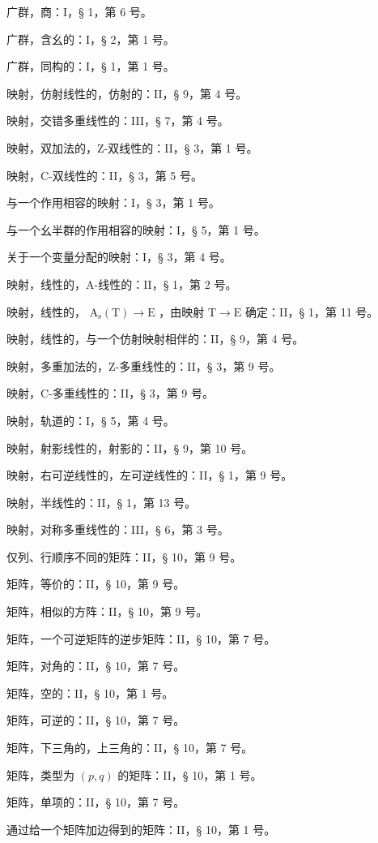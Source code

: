 广群，商：I，§ 1，第 6 号。

广群，含幺的：I，§ 2，第 1 号。

广群，同构的：I，§ 1，第 1 号。

映射，仿射线性的，仿射的：II，§ 9，第 4 号。

映射，交错多重线性的：III，§ 7，第 4 号。

映射，双加法的，Z-双线性的：II，§ 3，第 1 号。

映射，C-双线性的：II，§ 3，第 5 号。

与一个作用相容的映射：I，§ 3，第 1 号。

与一个幺半群的作用相容的映射：I，§ 5，第 1 号。

关于一个变量分配的映射：I，§ 3，第 4 号。

映射，线性的，A-线性的：II，§ 1，第 2 号。

映射，线性的， \(\mathrm{A_s(T)} \to \mathrm{E}\) ，由映射 \(\mathrm{T} \to \mathrm{E}\) 确定：II，§ 1，第 11 号。

映射，线性的，与一个仿射映射相伴的：II，§ 9，第 4 号。

映射，多重加法的，Z-多重线性的：II，§ 3，第 9 号。

映射，C-多重线性的：II，§ 3，第 9 号。

映射，轨道的：I，§ 5，第 4 号。

映射，射影线性的，射影的：II，§ 9，第 10 号。

映射，右可逆线性的，左可逆线性的：II，§ 1，第 9 号。

映射，半线性的：II，§ 1，第 13 号。

映射，对称多重线性的：III，§ 6，第 3 号。

仅列、行顺序不同的矩阵：II，§ 10，第 9 号。

矩阵，等价的：II，§ 10，第 9 号。

矩阵，相似的方阵：II，§ 10，第 9 号。

矩阵，一个可逆矩阵的逆步矩阵：II，§ 10，第 7 号。

矩阵，对角的：II，§ 10，第 7 号。

矩阵，空的：II，§ 10，第 1 号。

矩阵，可逆的：II，§ 10，第 7 号。

矩阵，下三角的，上三角的：II，§ 10，第 7 号。

矩阵，类型为 \((p,q)\) 的矩阵：II，§ 10，第 1 号。

矩阵，单项的：II，§ 10，第 7 号。

通过给一个矩阵加边得到的矩阵：II，§ 10，第 1 号。

